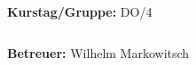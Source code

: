 \documentclass[12pt,a4paper]{article}
\begin{document}
\begin{verbatim}


\end{verbatim}
			\begin{flushleft}
			\textbf{\Large{Kurstag/Gruppe:}} \Large{DO/4}
			\end{flushleft}

\begin{verbatim}

\end{verbatim}
			\begin{flushleft}
			\LARGE{\textbf{Betreuer:}}	\Large{Wilhelm Markowitsch}	
			\end{flushleft}

\pagebreak
\setlength{\columnsep}{20pt}
\end{document}

